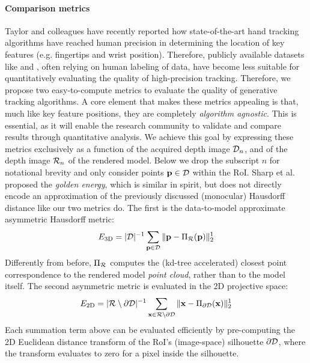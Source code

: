 \paragraph{Comparison metrics}
Taylor and colleagues  have recently reported how state-of-the-art hand tracking algorithms have reached human precision in determining the location of key features (e.g. fingertips and wrist position). Therefore, publicly available datasets like \cite{tompson2014real} and \cite{sridhar2013multicam}, often relying on human labeling of data, have become less suitable for quantitatively evaluating the quality of high-precision tracking. 
% 
Therefore, we propose two easy-to-compute metrics to evaluate the quality of generative tracking algorithms. A core element that makes these metrics appealing is that, much like key feature positions, they are completely \emph{algorithm agnostic}. This is essential, as it will enable the research community to validate and compare results through quantitative analysis. 
% 
We achieve this goal by expressing these metrics exclusively as a function of the acquired depth image $\mathcal{D}_n$, and of the depth image $\mathcal{R}_{n}$ of the rendered model. Below we drop the subscript $n$ for notational brevity and only consider points  $\mathbf{p} \in \mathcal{D}$ within the RoI.  Sharp et al.~ proposed the \emph{golden energy}, which is similar in spirit, but does not directly encode an approximation of the previously discussed (monocular) Hausdorff distance like our two metrics do. The first is the data-to-model approximate asymmetric Hausdorff metric: 
% 
\begin{equation}
E_\text{3D} = |\mathcal{D}|^{-1} \sum_{\mathbf{p} \in \mathcal{D}} \| \mathbf{p} - \Pi_{\mathcal{R}}(\mathbf{p}) \|_2^1
\label{eq:metric1}
\end{equation}
% 
Differently from before, $\Pi_{\mathcal{R}}$ computes the (kd-tree accelerated) closest point correspondence to the rendered model \emph{point cloud}, rather than to the model itself. The second asymmetric metric is evaluated in the 2D projective space:
% 
\begin{eqnarray}
E_\text{2D} = |\mathcal{R} \setminus \partial\mathcal{D}|^{-1} 
\sum_{\mathbf{x} \in \mathcal{R} \setminus \partial\mathcal{D}} \| \mathbf{x} - \Pi_{\partial\mathcal{D}}(\mathbf{x}) \|^1_2
\label{eq:metric2}
\end{eqnarray}
% 
Each summation term above can be evaluated efficiently by pre-computing the 2D Euclidean distance transform of the RoI's (image-space) silhouette $\partial \mathcal{D}$, where the transform evaluates to zero for a pixel inside the silhouette.

